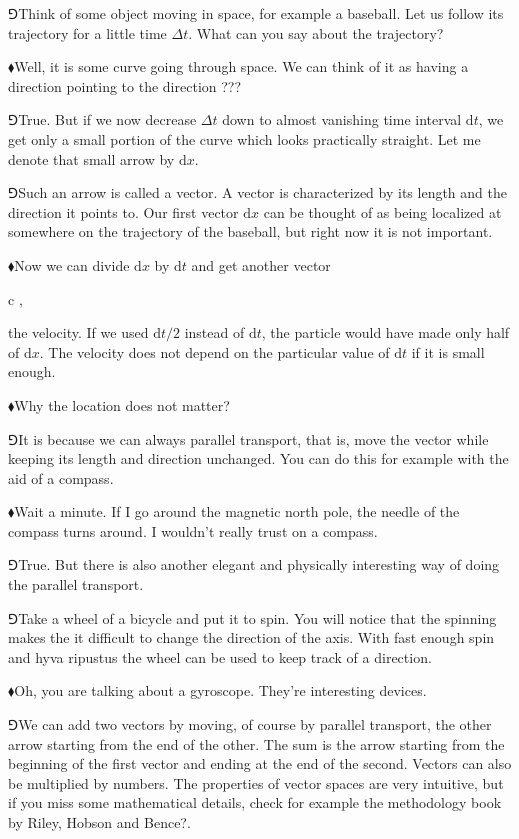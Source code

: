 \documentclass[10pt,oneside%
]{memoir}
\newenvironment{eqna}{\begin{IEEEeqnarray*}{c}}{\end{IEEEeqnarray*}\ignorespacesafterend}
\newcommand{\der}[2]{\frac{\dd#1}{\dd#2}}
\newcommand{\dd}{\mathrm{d}}
\newcommand{\hea}{\(\blacklozenge\)\;}
\newcommand{\heb}{\(\Game\)\;}
\begin{document}
\heb Think of some object moving in space, for example a baseball. Let us follow its trajectory for a little time \(\Delta t\). What can you say about the trajectory?

\hea Well, it is some curve going through space. We can think of it as having a direction pointing to the direction ???

\heb True. But if we now decrease \(\Delta t\) down to almost vanishing time interval \(\dd t\), we get only a small portion of the curve which looks practically straight. Let me denote that small arrow by \(\dd x\).

\heb Such an arrow is called a vector. A vector is characterized by its length and the direction it points to. Our first vector \(\dd x\) can be thought of as being localized at somewhere on the trajectory of the baseball, but right now it is not important.

\hea Now we can divide \(\dd x\) by \(\dd t\) and get another vector
\begin{eqna}
    \der{x}{t}\doteq{},
\end{eqna}
the velocity. If we used \(\dd t/2\) instead of \(\dd t\), the particle would have made only half of \(\dd x\). The velocity does not depend on the particular value of \(\dd t\) if it is small enough.

\hea Why the location does not matter?

\heb It is because we can always parallel transport, that is, move the vector while keeping its length and direction unchanged. You can do this for example with the aid of a compass.

\hea Wait a minute. If I go around the magnetic north pole, the needle of the compass turns around. I wouldn't really trust on a compass.

\heb True. But there is also another elegant and physically interesting way of doing the parallel transport.

\heb Take a wheel of a bicycle and put it to spin. You will notice that the spinning makes the it difficult to change the direction of the axis. With fast enough spin and hyva ripustus the wheel can be used to keep track of a direction.

\hea Oh, you are talking about a gyroscope. They're interesting devices.

\heb We can add two vectors by moving, of course by parallel transport, the other arrow starting from the end of the other. The sum is the arrow starting from the beginning of the first vector and ending at the end of the second. Vectors can also be multiplied by numbers. The properties of vector spaces are very intuitive, but if you miss some mathematical details, check for example the methodology book by Riley, Hobson and Bence?.
\end{document}
